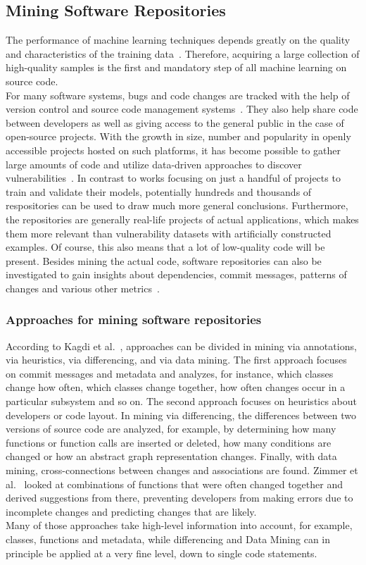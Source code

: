 \documentclass[
a4paper,
pagesize,
pdftex,
12pt,
twoside, %
BCOR=5mm, %
ngerman,
fleqn,
final,
]{scrartcl}
\begin{document}
	\subsection{Mining Software Repositories}\label{Mining-Software-Repositories}
	The performance of machine learning techniques depends greatly on the quality and characteristics of the training data~\cite{Pang.2015}. Therefore, acquiring a large collection of high-quality samples is the first and mandatory step of all machine learning on source code.\\
	For many software systems, bugs and code changes are tracked with the help of version control and source code management systems~\cite{Zhou.2017}. They also help share code between developers as well as giving access to the general public in the case of open-source projects. With the growth in size, number and popularity in openly accessible projects hosted on such platforms, it has become possible to gather large amounts of code and utilize data-driven approaches to discover vulnerabilities~\cite{Russell.2018}. In contrast to works focusing on just a handful of projects to train and validate their models, potentially hundreds and thousands of respositories can be used to draw much more general conclusions. Furthermore, the repositories are generally real-life projects of actual applications, which makes them more relevant than vulnerability datasets with artificially constructed examples. Of course, this also means that a lot of low-quality code will be present. Besides mining the actual code, software repositories can also be investigated to gain insights about dependencies, commit messages, patterns of changes and various other metrics~\cite{Liu.2018}.\\
	\subsubsection{Approaches for mining software repositories}
	According to Kagdi et al.~\cite{Kagdi.2005}, approaches can be divided in mining via annotations, via heuristics, via differencing, and via data mining. The first approach focuses on commit messages and metadata and analyzes, for instance, which classes change how often, which classes change together, how often changes occur in a particular subsystem and so on. The second approach focuses on heuristics about developers or code layout. In mining via differencing, the differences between two versions of source code are analyzed, for example, by determining how many functions or function calls are inserted or deleted, how many conditions are changed or how an abstract graph representation changes. Finally, with data mining, cross-connections between changes and associations are found. Zimmer et al.~\cite{Zimmermann.2005} looked at combinations of functions that were often changed together and derived suggestions from there, preventing developers from making errors due to incomplete changes and predicting changes that are likely.\\
	Many of those approaches take high-level information into account, for example, classes, functions and metadata, while differencing and Data Mining can in principle be applied at a very fine level, down to single code statements.
\end{document}
